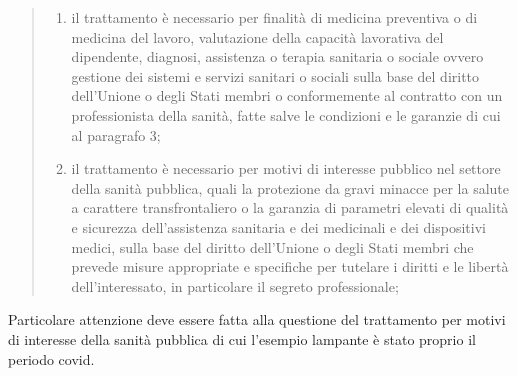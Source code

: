 \begin{quote}
{\begin{enumerate}
\begin{enumerate}[label=\alph*)]
                    \item il trattamento è necessario per finalità di medicina preventiva o di medicina del lavoro, valutazione della capacità lavorativa del dipendente, diagnosi, assistenza o terapia sanitaria o sociale ovvero gestione dei sistemi e servizi sanitari o sociali sulla base del diritto dell'Unione o degli Stati membri o conformemente al contratto con un professionista della sanità, fatte salve le condizioni e le garanzie di cui al paragrafo 3;
                    \item il trattamento è necessario per motivi di interesse pubblico nel settore della sanità pubblica, quali la protezione da gravi minacce per la salute a carattere transfrontaliero o la garanzia di parametri elevati di qualità e sicurezza dell'assistenza sanitaria e dei medicinali e dei dispositivi medici, sulla base del diritto dell'Unione o degli Stati membri che prevede misure appropriate e specifiche per tutelare i diritti e le libertà dell'interessato, in particolare il segreto professionale; 
                \end{enumerate}
        \end{enumerate}
    }
\end{quote}
Particolare attenzione deve essere fatta alla questione del trattamento per motivi di interesse della sanità pubblica di cui l'esempio lampante è stato proprio il periodo covid.
